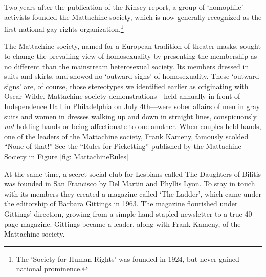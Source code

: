 \begin{refsection}
Two years after the publication of the Kinsey report, a group of `homophile' activists founded the Mattachine society, which is now generally recognized as the first national gay-rights organization.\footnote{The `Society for Human Rights' was founded in 1924, but never gained national prominence.}

The Mattachine society, named for a European tradition of theater masks, sought to change the prevailing view of homosexuality by presenting the membership as no different than the mainstream heterosexual society. Its members dressed in suits and skirts, and showed no `outward signs' of homosexuality. These `outward signs' are, of course, those stereotypes we identified earlier as originating with Oscar Wilde. Mattachine society demonstrations---held annually in front of Independence Hall in Philadelphia on July 4th---were sober affairs of men in gray suits and women in dresses walking up and down in straight lines, conspicuously \emph{not} holding hands or being affectionate to one another. When couples held hands, one of the leaders of the Mattachine society, Frank Kameny, famously scolded ``None of that!'' See the ``Rules for Picketting'' published by the Mattachine Society in Figure \ref{fig: MattachineRules}

At the same time, a secret social club for Lesbians called The Daughters of Bilitis was founded in San Francisco by Del Martin and Phyllis Lyon. To stay in touch with its members they created a magazine called `The Ladder', which came under the editorship of Barbara Gittings in 1963. The magazine flourished under Gittings' direction, growing from a simple hand-stapled newsletter to a true 40-page magazine. Gittings became a leader, along with Frank Kameny, of the Mattachine society.

\begin{marginfigure}
 \begin{center}


\end{center}
\end{marginfigure}
\end{refsection}
